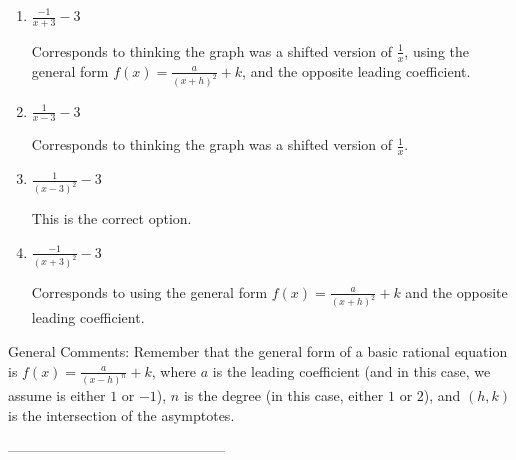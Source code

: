 \documentclass{article}[10pt]
\begin{document}
\begin{enumerate}[label=\Alph*.] 
\item $ \frac{-1}{x + 3} - 3 $ 

 Corresponds to thinking the graph was a shifted version of $\frac{1}{x}$, using the general form $f(x) = \frac{a}{(x+h)^2}+k$, and the opposite leading coefficient. 
\item $ \frac{1}{x - 3} - 3 $ 

 Corresponds to thinking the graph was a shifted version of $\frac{1}{x}$. 
\item $ \frac{1}{(x - 3)^2} - 3 $ 

 This is the correct option. 
\item $ \frac{-1}{(x + 3)^2} - 3 $ 

 Corresponds to using the general form $f(x) = \frac{a}{(x+h)^2}+k$ and the opposite leading coefficient. 
\end{enumerate} 
 
General Comments: Remember that the general form of a basic rational equation is $ f(x) = \frac{a}{(x-h)^n} + k$, where $a$ is the leading coefficient (and in this case, we assume is either $1$ or $-1$), $n$ is the degree (in this case, either $1$ or $2$), and $(h, k)$ is the intersection of the asymptotes.

-----------------------------------------------
\end{document}
